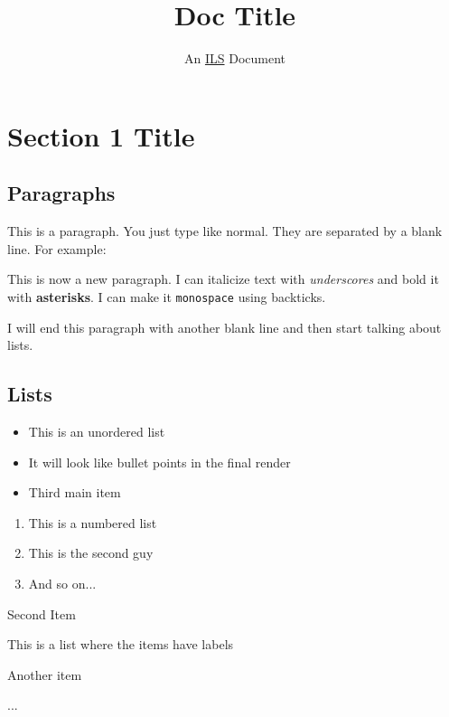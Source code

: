 \documentclass[mpinclude=true]{scrartcl}
\title{Doc Title}
\subtitle{An \href{https://www.independentlearning.science}{ILS} Document}
\begin{document}
\maketitle
\tableofcontents
\pagestyle{headings}

\section{Section 1 Title}


\subsection{Paragraphs}


This is a paragraph.  You just type like normal.  They are separated
by a blank line.  For example:

This is now a new paragraph.  I can italicize text with \emph{underscores}
and bold it with \textbf{asterisks}.  I can make it \texttt{monospace} using
backticks.

I will end this paragraph with another blank line and then start
talking about lists.


\subsection{Lists}


\begin{itemize}
\item This is an unordered list
\item It will look like bullet points in the final render
\item Third main item
\end{itemize}

\begin{enumerate}
\item This is a numbered list
\item This is the second guy
\item And so on...
\end{enumerate}

\begin{labeling}
{Second Item}\item[First Item] This is a list where the items have labels
\item[Second Item] Another item
\item[And So On] ...
\end{labeling}
\end{document}
